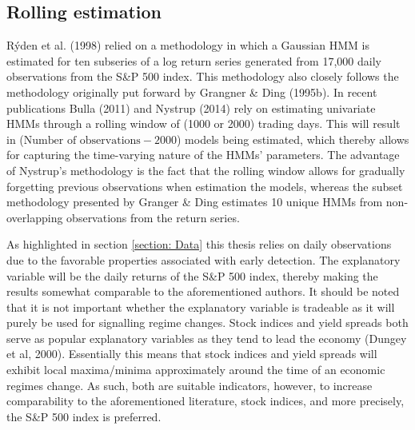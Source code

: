 \subsection{Rolling estimation}
Rýden et al. (1998) relied on a methodology in which a Gaussian HMM is estimated for ten subseries of a log return series generated from 17,000 daily observations from the S\&P 500 index. This methodology also closely follows the methodology originally put forward by Grangner \& Ding (1995b). In recent publications Bulla (2011) and Nystrup (2014) rely on estimating univariate HMMs through a rolling window of (1000 or 2000) trading days. This will result in ($\text{Number of observations} - 2000$) models being estimated, which thereby allows for capturing the time-varying nature of the HMMs' parameters. The advantage of Nystrup's methodology is the fact that the rolling window allows for gradually forgetting previous observations when estimation the models, whereas the subset methodology presented by Granger \& Ding estimates 10 unique HMMs from non-overlapping observations from the return series. 

As highlighted in section \ref{section: Data} this thesis relies on daily observations due to the favorable properties associated with early detection. The explanatory variable will be the daily returns of the S\&P 500 index, thereby making the results somewhat comparable to the aforementioned authors. It should be noted that it is not important whether the explanatory variable is tradeable as it will purely be used for signalling regime changes. Stock indices and yield spreads both serve as popular explanatory variables as they tend to lead the economy (Dungey et al, 2000). Essentially this means that stock indices and yield spreads will exhibit local maxima/minima approximately around the time of an economic regimes change. As such, both are suitable indicators, however, to increase comparability to the aforementioned literature, stock indices, and more precisely, the S\&P 500 index is preferred. 

